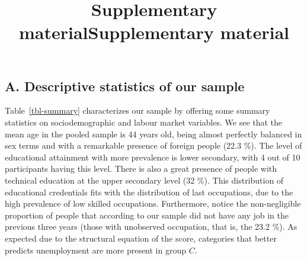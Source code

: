 \documentclass[
  11pt]{article}
\title{Supplementary material}
\author{}
\date{}
\begin{document}
\def\spacingset#1{\renewcommand{\baselinestretch}%
{#1}\small\normalsize} \spacingset{1}



\title{Supplementary material}
\author{
}
\maketitle

\bigskip
\bigskip

\bigskip



\newpage
\spacingset{1.2} %

\subsection{A. Descriptive statistics of our
sample}\label{a.-descriptive-statistics-of-our-sample}

Table~\ref{tbl-summary} characterizes our sample by offering some
summary statistics on sociodemographic and labour market variables. We
see that the mean age in the pooled sample is 44 years old, being almost
perfectly balanced in sex terms and with a remarkable presence of
foreign people (22.3 \%). The level of educational attainment with more
prevalence is lower secondary, with 4 out of 10 participants having this
level. There is also a great presence of people with technical education
at the upper secondary level (32 \%). This distribution of educational
credentials fits with the distribution of last occupations, due to the
high prevalence of low skilled occupations. Furthermore, notice the
non-negligible proportion of people that according to our sample did not
have any job in the previous three years (those with unobserved
occupation, that is, the 23.2 \%). As expected due to the structural
equation of the score, categories that better predicts unemployment are
more present in group \(C\).
\end{document}

